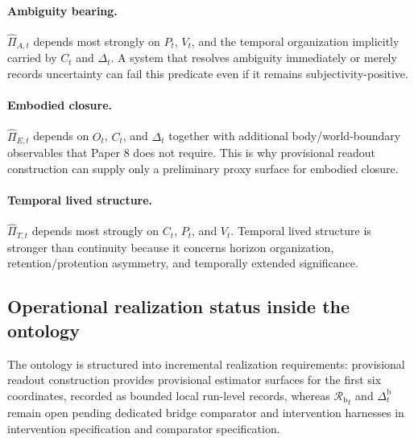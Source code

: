 \documentclass[11pt,a4paper]{article}
\theoremstyle{definition}
\newcommand{\OwnField}{O}
\newcommand{\ContField}{C}
\newcommand{\Persp}{P}
\newcommand{\ValAsym}{V}
\newcommand{\IntervProf}{\Delta}
\newcommand{\BridgeMargin}{\mathcal{R}_{\mathrm{b}}}
\begin{document}
\paragraph{Ambiguity bearing.}
$\widehat{\Pi}_{A,t}$ depends most strongly on $\Persp_t$, $\ValAsym_t$, and the temporal organization implicitly carried by $\ContField_t$ and $\IntervProf_t$. A system that resolves ambiguity immediately or merely records uncertainty can fail this predicate even if it remains subjectivity-positive.

\paragraph{Embodied closure.}
$\widehat{\Pi}_{E,t}$ depends on $\OwnField_t$, $\ContField_t$, and $\IntervProf_t$ together with additional body/world-boundary observables that Paper 8 does not require. This is why provisional readout construction can supply only a preliminary proxy surface for embodied closure.

\paragraph{Temporal lived structure.}
$\widehat{\Pi}_{T,t}$ depends most strongly on $\ContField_t$, $\Persp_t$, and $\ValAsym_t$. Temporal lived structure is stronger than continuity because it concerns horizon organization, retention/protention asymmetry, and temporally extended significance.

\subsection{Operational realization status inside the ontology}
The ontology is structured into incremental realization requirements: provisional readout construction provides provisional estimator surfaces for the first six coordinates, recorded as bounded local run-level records, whereas ${\BridgeMargin}_t$ and $\IntervProf^{\mathrm{b}}_t$ remain open pending dedicated bridge comparator and intervention harnesses in intervention specification and comparator specification.
\end{document}
